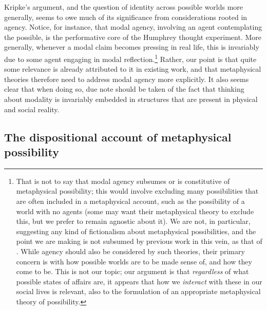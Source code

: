 \documentclass{article}
\begin{document}
Kripke's argument, and the question of identity across possible worlds more generally, seems to owe much of its significance from considerations rooted in agency. Notice, for instance, that modal agency, involving an agent contemplating the possible, is the performative core of the Humphrey thought experiment. More generally, whenever a modal claim becomes pressing in real life, this is invariably due to some agent engaging in modal reflection.\footnote{That is not to say that modal agency subsumes or is constitutive of metaphysical possibility; this would involve excluding many possibilities that are often included in a metaphysical account, such as the possibility of a world with no agents (some may want their metaphysical theory to exclude this, but we prefer to remain agnostic about it). We are not, in particular, suggesting any kind of fictionalism about metaphysical possibilities, and the point we are making is not subsumed by previous work in this vein, as that of \cite{ficr,ficrfix}. While agency should also be considered by such theories, their primary concern is with how possible worlds are to be made sense of, and how they come to be. This is not our topic; our argument is that \emph{regardless} of what possible states of affairs are, it appears that how we \emph{interact} 
with these in our social lives is relevant, also to the formulation of an appropriate metaphysical theory of possibility.} Rather, our point is that quite some relevance is already attributed to it in existing work, and that metaphysical theories therefore need to address modal agency more explicitly. It also seems clear that when doing so, due note should be taken of the fact that thinking about modality is invariably embedded in structures that are present in physical and social reality.

\subsection*{The dispositional account of metaphysical possibility}
\end{document}
